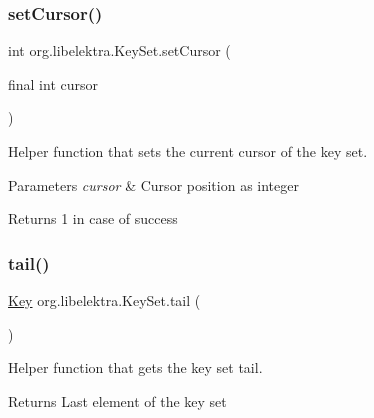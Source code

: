 \subsubsection{\texorpdfstring{set\+Cursor()}{setCursor()}}
{\footnotesize\ttfamily int org.\+libelektra.\+Key\+Set.\+set\+Cursor (\begin{DoxyParamCaption}\item[{final int}]{cursor }\end{DoxyParamCaption})\hspace{0.3cm}{\ttfamily [inline]}}



Helper function that sets the current cursor of the key set. 


\begin{DoxyParams}{Parameters}
{\em cursor} & Cursor position as integer \\
\hline
\end{DoxyParams}
\begin{DoxyReturn}{Returns}
1 in case of success 
\end{DoxyReturn}
\mbox{\label{classorg_1_1libelektra_1_1KeySet_ab81aff6c88595b3f4c3307d1f996857f}} 
\subsubsection{\texorpdfstring{tail()}{tail()}}
{\footnotesize\ttfamily \hyperlink{classorg_1_1libelektra_1_1Key}{Key} org.\+libelektra.\+Key\+Set.\+tail (\begin{DoxyParamCaption}{ }\end{DoxyParamCaption})\hspace{0.3cm}{\ttfamily [inline]}}



Helper function that gets the key set tail. 

\begin{DoxyReturn}{Returns}
Last element of the key set 
\end{DoxyReturn}
\mbox{\label{classorg_1_1libelektra_1_1KeySet_a9c1e2918acce8c7cda5be406989c87af}} 
